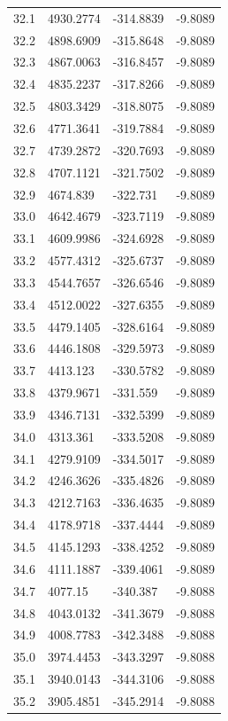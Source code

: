 \begin{table}[H]
\begin{tabular}{llll}
32.1 & 4930.2774 & -314.8839 & -9.8089 \\
32.2 & 4898.6909 & -315.8648 & -9.8089 \\
32.3 & 4867.0063 & -316.8457 & -9.8089 \\
32.4 & 4835.2237 & -317.8266 & -9.8089 \\
32.5 & 4803.3429 & -318.8075 & -9.8089 \\
32.6 & 4771.3641 & -319.7884 & -9.8089 \\
32.7 & 4739.2872 & -320.7693 & -9.8089 \\
32.8 & 4707.1121 & -321.7502 & -9.8089 \\
32.9 & 4674.839 & -322.731 & -9.8089 \\
33.0 & 4642.4679 & -323.7119 & -9.8089 \\
33.1 & 4609.9986 & -324.6928 & -9.8089 \\
33.2 & 4577.4312 & -325.6737 & -9.8089 \\
33.3 & 4544.7657 & -326.6546 & -9.8089 \\
33.4 & 4512.0022 & -327.6355 & -9.8089 \\
33.5 & 4479.1405 & -328.6164 & -9.8089 \\
33.6 & 4446.1808 & -329.5973 & -9.8089 \\
33.7 & 4413.123 & -330.5782 & -9.8089 \\
33.8 & 4379.9671 & -331.559 & -9.8089 \\
33.9 & 4346.7131 & -332.5399 & -9.8089 \\
34.0 & 4313.361 & -333.5208 & -9.8089 \\
34.1 & 4279.9109 & -334.5017 & -9.8089 \\
34.2 & 4246.3626 & -335.4826 & -9.8089 \\
34.3 & 4212.7163 & -336.4635 & -9.8089 \\
34.4 & 4178.9718 & -337.4444 & -9.8089 \\
34.5 & 4145.1293 & -338.4252 & -9.8089 \\
34.6 & 4111.1887 & -339.4061 & -9.8089 \\
34.7 & 4077.15 & -340.387 & -9.8088 \\
34.8 & 4043.0132 & -341.3679 & -9.8088 \\
34.9 & 4008.7783 & -342.3488 & -9.8088 \\
35.0 & 3974.4453 & -343.3297 & -9.8088 \\
35.1 & 3940.0143 & -344.3106 & -9.8088 \\
35.2 & 3905.4851 & -345.2914 & -9.8088 \\

\end{tabular}
\end{table}
